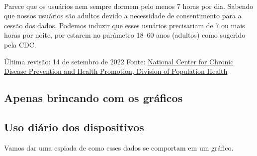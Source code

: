 \begin{center}
\end{center}
{ \hspace*{\fill} \\}

Parece que os usuários nem sempre dormem pelo menos 7 horas por dia.
Sabendo que nossos usuários são adultos devido a necessidade de
consentimento para a cessão dos dados. Podemos induzir que esses
usuários precisariam de 7 ou mais horas por noite, por estarem no
parâmetro 18--60 anos (adultos) como sugerido pela CDC.

Última revisão: 14 de setembro de 2022 Fonte:
\href{https://www.cdc.gov/sleep/about_sleep/how_much_sleep.html}{National
    Center for Chronic Disease Prevention and Health Promotion, Division of
    Population Health}

\subsection{Apenas brincando com os gráficos}

\hypertarget{uso-diuxe1rio-dos-dispositivos}{%
    \subsection{Uso diário dos
        dispositivos}\label{uso-diuxe1rio-dos-dispositivos}}

Vamos dar uma espiada de como esses dados se comportam em um gráfico.

